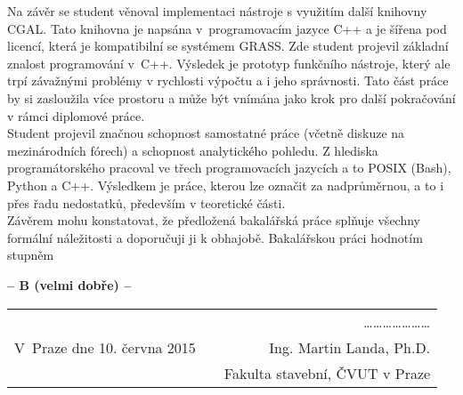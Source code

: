 \documentclass[czech,11pt,a4paper]{article}
\begin{document}
Na závěr se student věnoval implementaci nástroje s využitím další
knihovny CGAL. Tato knihovna je napsána v~programovacím jazyce C++ a
je šířena pod licencí, která je kompatibilní se systémem GRASS. Zde
student projevil základní znalost programování v~C++. Výsledek je
prototyp funkčního nástroje, který ale trpí závažnými problémy v
rychlosti výpočtu a i jeho správnosti. Tato část práce by si zasloužila
více prostoru a může být vnímána jako krok pro další pokračování
v rámci diplomové práce.
\\

Student projevil značnou schopnost samostatné práce (včetně diskuze na
mezinárodních fórech) a schopnost analytického pohledu. Z hlediska
programátorského pracoval ve třech programovacích jazycích a to POSIX
(Bash), Python a C++. Výsledkem je práce, kterou lze označit za
nadprůměrnou, a to i přes řadu nedostatků, především v teoretické
části.
\\
\newpage
Závěrem mohu konstatovat, že předložená bakalářská práce splňuje
všechny formální náležitosti a doporučuji ji k obhajobě. Bakalářskou
práci hodnotím stupněm

\vskip 2cm

\begin{center}
{\bf -- B (velmi dobře)  --}
\end{center}

\vskip 2cm

\begin{tabular}{lp{}r}
& & \ldots\ldots\ldots\ldots\ldots\ldots\ldots \\
V~Praze dne 10. června 2015 & & Ing. Martin Landa, Ph.D. \\
& & Fakulta stavební, ČVUT v Praze \\
\end{tabular}
\end{document}

